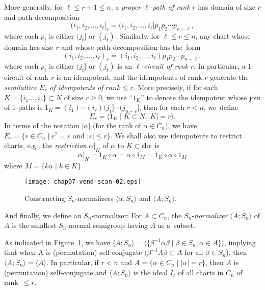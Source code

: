 \documentclass{surv-l}
\numberwithin{equation}{section}
\numberwithin{table}{section}
\numberwithin{figure}{section}
\theoremstyle{plain}
\theoremstyle{definition}
\begin{document}
More generally, for $\ell\leq r+1 \leq n$, a \emph{proper}
$\ell$-\emph{path of rank} $r$ has domain of size $r$ and path
decomposition
\[
(i_{1}, i_{2},\ldots, i_{\ell}]_{r}=(i_{1}, i_{2},\ldots, i_{\ell}]p_{1}p_{2}\cdots p_{n-\ell},
\]
where each $p_{t}$ is either $(j_{t}]$ or $(j_{t})$. Similarly,
for $\ell\leq r\leq n$, any chart whose domain has size $r$ and
whose path decomposition has the~form
\[
(i_{1}, i_{2},\ldots, i_{\ell})_{r}=(i_{1}, i_{2},\ldots, i_{\ell})p_{1}p_{2}\cdots p_{n-\ell},
\]
where each $p_{t}$ is either $(j_{t}]$ or $(j_{t})$ is an
$\ell$-\emph{circuit of rank} $r$. In particular, a 1-circuit of
rank $r$ is an idempotent, and the idempotents of rank $r$
generate the \emph{semilattice} $E_{r}$ \emph{of idempotents of}
$rank\leq r$. More precisely, if for each $K=\{i_{1}\ldots,
i_{r}\}\subset N$ of size $r\geq 0$, we use ``$1_{K}$'' to denote
the idempotent whose join of 1-paths is
$1_{K}=(i_{1})\cdots(i_{r})(j_{1}]\cdots(j_{n-r}]$, then for each
$r<n$, we~define
\begin{equation}\label{eq7.28.3}
E_{r}=\langle 1_{K}\mid K\subset N;|K|=r\rangle.
\end{equation}
In terms of the notation $|\alpha|$ (for the rank of $\alpha\in
C_{n}$), we have $E_{r}=\{\varepsilon \in
C_{n} \mid \varepsilon^{2}=\varepsilon$ and $|\varepsilon|\leq
r\}$. We shall also use idempotents to restrict charts, e.g., the
\emph{restriction} $\alpha|_{K}$ of $\alpha$ to $K\subset
\mathbf{d}\alpha$~is
\begin{equation}\label{eq7.28.4}
 \alpha|_{K}=1_{K}\circ\alpha=\alpha \circ 1_{M}=1_{K}\circ\alpha\circ 1_{M}
\end{equation}
where $M=\{k\alpha \mid k\in K\}$.

\setcounter{figure}{4}
\begin{figure}[!h]
\texttt{[image: chap07-vend-scan-02.eps]}
\caption{Constructing $S_{n}$-normalizers $\langle\alpha;S_{n}\rangle$ and
$\langle A;S_{n}\rangle$.}\label{fig7.28.5}
\end{figure}

And finally, we define an $S_{n}$-normalizer: For $A\subset
C_{n}$, the $S_{n}$-\emph{normalizer} $\langle A;S_{n}\rangle$ of
$A$ is the smallest $S_{n}$-normal semigroup having $A$ as
a~subset.

As indicated in Figure~\ref{fig7.28.5}, we have $\langle
A;S_{n}\rangle=\langle\{\beta^{-1}\alpha\beta \mid \beta\in
S_{n};\alpha\in  A\}\rangle$, implying that when A is
(permutation) self-conjugate $(\beta^{-1}A\beta\subset A$ for all
$\beta\in S_{n}$), then $\langle A;S_{n}\rangle=\langle A\rangle$.
In particular, if $r<n$ and $A=\{\alpha\in C_{n} \mid
|\alpha|=r\}$, then $A$ is (permutation) self-conjugate and
$\langle A;S_{n}\rangle$ is the ideal $I_{r}$ of all charts in
$C_{n}$ of rank~$\leq r$.
\end{document}

